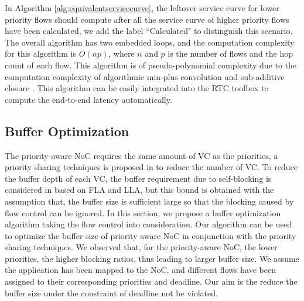 \documentclass[10pt,journal]{IEEEtran}
\begin{document}
In Algorithm \ref{alg:equivalentservicecurve}, the leftover service curve for lower priority flows should compute after all the service curve of higher priority flows have been calculated, we add the label ``Calculated" to distinguish this scenario. The overall algorithm has two embedded loops, and the computation complexity for this algorithm is $O(np)$, where $n$ and $p$ is the number of flows and the hop count of each flow. This algorithm is of pseudo-polynomial complexity due to the computation complexity of algorithmic min-plus convolution and sub-additive closure \cite{Bouillard2008}. This algorithm can be easily integrated into the RTC toolbox\cite{rtc} to compute the end-to-end latency automatically.

\subsection{Buffer Optimization}
The priority-aware NoC requires the same amount of VC as the priorities, a priority sharing techniques is proposed in \cite{5161497} to reduce the number of VC. To reduce the buffer depth of each VC, the buffer requirement due to self-blocking is considered in \cite{189} based on FLA and LLA, but this bound is obtained with the assumption that, the buffer size is sufficient large so that the blocking caused by flow control can be ignored. In this section, we propose a buffer optimization algorithm taking the flow control into consideration. Our algorithm can be used to optimize the buffer size of priority aware NoC in conjunction with the priority sharing techniques. We observed that, for the priority-aware NoC, the lower priorities, the higher blocking ratios, thus leading to larger buffer size. We assume the application has been mapped to the NoC, and different flows have been assigned to their corresponding priorities and deadline. Our aim is the reduce the buffer size under the constraint of deadline not be violated.
\end{document}
